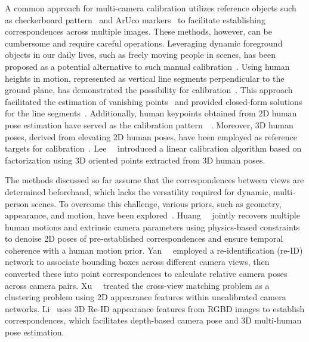 A common approach for multi-camera calibration utilizes reference objects such as checkerboard pattern~\cite{Zhang96} and ArUco markers~\cite{aruco2014} to facilitate establishing correspondences across multiple images. These methods, however, can be cumbersome and require careful operations. Leveraging dynamic foreground objects in our daily lives, such as freely moving people in scenes, has been proposed as a potential alternative to such manual calibration~\cite{Takahashi18, leeRAL2022,Lv_pami2006_walking,nakano2021,albl2017two}. Using human heights in motion, represented as vertical line segments perpendicular to the ground plane, has demonstrated the possibility for calibration~\cite{Lv_pami2006_walking,nakano2021}. This approach facilitated the estimation of vanishing points~\cite{Lv_pami2006_walking} and provided closed-form solutions for the line segments~\cite{nakano2021}. Additionally, human keypoints obtained from 2D human pose estimation have served as the calibration pattern~\etal~\cite{Takahashi18}. Moreover, 3D human poses, derived from elevating 2D human poses, have been employed as reference targets for calibration~\cite{leeRAL2022,Garau2020}. Lee~\etal~\cite{leeRAL2022} introduced a linear calibration algorithm based on factorization using 3D oriented points extracted from 3D human poses.


The methods discussed so far assume that the correspondences between views are determined beforehand, which lacks the versatility required for dynamic, multi-person scenes. To overcome this challenge, various priors, such as geometry, appearance, and motion, have been explored~\cite{huang2021dynamic,yan2021wide-baseline,xu2023multi,li2024multi}. Huang~\etal~\cite{huang2021dynamic} jointly recovers multiple human motions and extrinsic camera parameters using physics-based constraints to denoise 2D poses of pre-established correspondences and ensure temporal coherence with a human motion prior. Yan~\etal~\cite{yan2021wide-baseline} employed a re-identification (re-ID) network to associate bounding boxes across different camera views, then converted these into point correspondences to calculate relative camera poses across camera pairs. Xu~\etal~\cite{xu2023multi} treated the cross-view matching problem as a clustering problem using 2D appearance features within uncalibrated camera networks. Li~\etal\cite{li2024multi} uses 3D Re-ID appearance features from RGBD images to establish correspondences, which facilitates depth-based camera pose and 3D multi-human pose estimation. 


